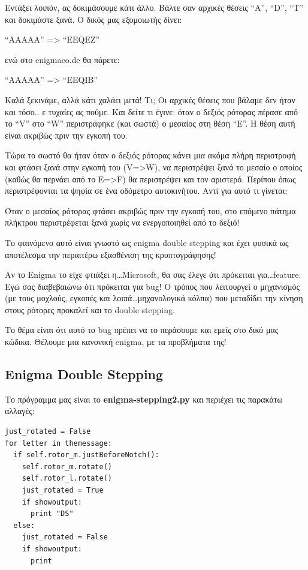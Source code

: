 \documentclass[a4paper,twoside,12pt]{article}
\begin{document}
Εντάξει λοιπόν, ας δοκιμάσουμε κάτι άλλο. Βάλτε σαν αρχικές θέσεις “A”, “D”, “T” και δοκιμάστε ξανά. Ο δικός μας εξομοιωτής δίνει:

“AAAAA” => “EEQEZ”

ενώ στο enigmaco.de θα πάρετε:

“AAAAA” => “EEQIB”

Καλά ξεκινάμε, αλλά κάτι χαλάει μετά! Τι; Οι αρχικές θέσεις που βάλαμε δεν ήταν και τόσο.. ε τυχαίες ας πούμε.  Και δείτε τι έγινε: όταν ο δεξιός ρότορας πέρασε από το “V” στο “W” περιστράφηκε (και σωστά) ο μεσαίος στη θέση “Ε”. Η θέση αυτή είναι ακριβώς πριν την εγκοπή του.

Τώρα το σωστό θα ήταν όταν ο δεξιός ρότορας κάνει μια ακόμα πλήρη περιστροφή και φτάσει ξανά στην εγκοπή του (V=>W), να περιστρέψει ξανά το μεσαίο ο οποίος (καθώς θα περνάει από το E=>F) θα περιστρέψει και τον αριστερό. Περίπου όπως περιστρέφονται τα ψηφία σε ένα οδόμετρο αυτοκινήτου. Αντί για αυτό τι γίνεται;

Όταν ο μεσαίος ρότορας φτάσει ακριβώς πριν την εγκοπή του, στο επόμενο πάτημα πλήκτρου περιστρέφεται ξανά χωρίς να ενεργοποιηθεί από το δεξιό!

Το φαινόμενο αυτό είναι γνωστό ως enigma double stepping και έχει φυσικά ως αποτέλεσμα την περαιτέρω εξασθένιση της κρυπτογράφησης!

Αν το Enigma το είχε φτιάξει η\ldots Microsoft, θα σας έλεγε ότι πρόκειται για\ldots feature. Εγώ σας διαβεβαιώνω ότι πρόκειται για bug! Ο τρόπος που λειτουργεί ο μηχανισμός (με τους μοχλούς, εγκοπές και λοιπά\ldots μηχανολογικά κόλπα) που μεταδίδει την κίνηση στους ρότορες προκαλεί και το double stepping.

Το θέμα είναι ότι αυτό το bug πρέπει να το περάσουμε και εμείς στο δικό μας κώδικα. Θέλουμε μια κανονική enigma, με τα προβλήματα της!

\subsection{Enigma Double Stepping}

Το πρόγραμμα μας είναι το \textbf{enigma-stepping2.py} και περιέχει τις παρακάτω αλλαγές:

\begin{verbatim}
just_rotated = False
for letter in themessage:
  if self.rotor_m.justBeforeNotch():
    self.rotor_m.rotate()
    self.rotor_l.rotate()
    just_rotated = True
    if showoutput:
      print "DS"
  else:
    just_rotated = False
    if showoutput:
      print
\end{verbatim}
\end{document}
